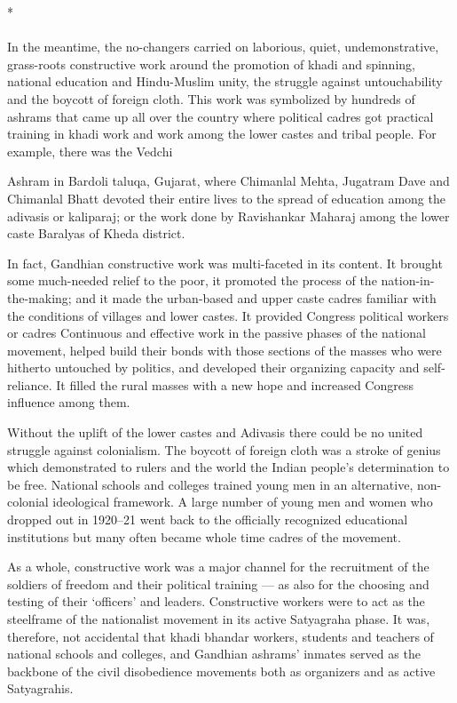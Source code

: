 \begin{multicols}{2}
\begin{center}*\end{center}

\paragraph*{}

In the meantime, the no-changers carried on laborious, quiet, undemonstrative, grass-roots constructive work around the promotion of khadi and spinning, national education and Hindu-Muslim unity, the struggle against untouchability and the boycott of foreign cloth. This work was symbolized by hundreds of ashrams that came up all over the country where political cadres got practical training in khadi work and work among the lower castes and tribal people. For example, there was the Vedchi

Ashram in Bardoli taluqa, Gujarat, where Chimanlal Mehta, Jugatram Dave and Chimanlal Bhatt devoted their entire lives to the spread of education among the adivasis or kaliparaj; or the work done by Ravishankar Maharaj among the lower caste Baralyas of Kheda district.

In fact, Gandhian constructive work was multi-faceted in its content. It brought some much-needed relief to the poor, it promoted the process of the nation-in-the-making; and it made the urban-based and upper caste cadres familiar with the conditions of villages and lower castes. It provided Congress political workers or cadres Continuous and effective work in the passive phases of the national movement, helped build their bonds with those sections of the masses who were hitherto untouched by politics, and developed their organizing capacity and self-reliance. It filled the rural masses with a new hope and increased Congress influence among them.

Without the uplift of the lower castes and Adivasis there could be no united struggle against colonialism. The boycott of foreign cloth was a stroke of genius which demonstrated to rulers and the world the Indian people's determination to be free. National schools and colleges trained young men in an alternative, non-colonial ideological framework. A large number of young men and women who dropped out in 1920--21 went back to the officially recognized educational institutions but many often became whole time cadres of the movement.

As a whole, constructive work was a major channel for the recruitment of the soldiers of freedom and their political training --- as also for the choosing and testing of their `officers' and leaders. Constructive workers were to act as the steelframe of the nationalist movement in its active Satyagraha phase. It was, therefore, not accidental that khadi bhandar workers, students and teachers of national schools and colleges, and Gandhian ashrams' inmates served as the backbone of the civil disobedience movements both as organizers and as active Satyagrahis.


\end{multicols}
